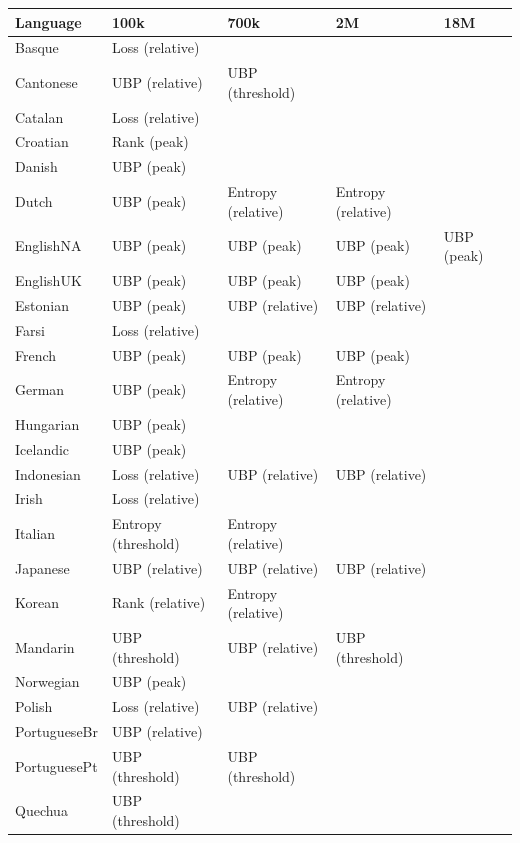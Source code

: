 \begin{table}[t]
    \centering
    \footnotesize
    \begin{tabular}{lllll}
    \toprule
    Language & 100k & 700k & 2M & 18M \\
    \midrule
    Basque & Loss (relative) &  &  &  \\
    Cantonese & UBP (relative) & UBP (threshold) &  &  \\
    Catalan & Loss (relative) &  &  &  \\
    Croatian & Rank (peak) &  &  &  \\
    Danish & UBP (peak) &  &  &  \\
    Dutch & UBP (peak) & Entropy (relative) & Entropy (relative) &  \\
    EnglishNA & UBP (peak) & UBP (peak) & UBP (peak) & UBP (peak) \\
    EnglishUK & UBP (peak) & UBP (peak) & UBP (peak) &  \\
    Estonian & UBP (peak) & UBP (relative) & UBP (relative) &  \\
    Farsi & Loss (relative) &  &  &  \\
    French & UBP (peak) & UBP (peak) & UBP (peak) &  \\
    German & UBP (peak) & Entropy (relative) & Entropy (relative) &  \\
    Hungarian & UBP (peak) &  &  &  \\
    Icelandic & UBP (peak) &  &  &  \\
    Indonesian & Loss (relative) & UBP (relative) & UBP (relative) &  \\
    Irish & Loss (relative) &  &  &  \\
    Italian & Entropy (threshold) & Entropy (relative) &  &  \\
    Japanese & UBP (relative) & UBP (relative) & UBP (relative) &  \\
    Korean & Rank (relative) & Entropy (relative) &  &  \\
    Mandarin & UBP (threshold) & UBP (relative) & UBP (threshold) &  \\
    Norwegian & UBP (peak) &  &  &  \\
    Polish & Loss (relative) & UBP (relative) &  &  \\
    PortugueseBr & UBP (relative) &  &  &  \\
    PortuguesePt & UBP (threshold) & UBP (threshold) &  &  \\
    Quechua & UBP (threshold) &  &  &  \\

\end{tabular}
\end{table}
